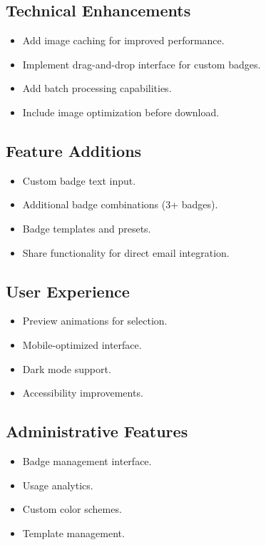 \documentclass[12pt]{article}
\begin{document}
\subsection{Technical Enhancements}
\begin{itemize}
    \item Add image caching for improved performance.
    \item Implement drag-and-drop interface for custom badges.
    \item Add batch processing capabilities.
    \item Include image optimization before download.
\end{itemize}

\subsection{Feature Additions}
\begin{itemize}
    \item Custom badge text input.
    \item Additional badge combinations (3+ badges).
    \item Badge templates and presets.
    \item Share functionality for direct email integration.
\end{itemize}

\subsection{User Experience}
\begin{itemize}
    \item Preview animations for selection.
    \item Mobile-optimized interface.
    \item Dark mode support.
    \item Accessibility improvements.
\end{itemize}

\subsection{Administrative Features}
\begin{itemize}
    \item Badge management interface.
    \item Usage analytics.
    \item Custom color schemes.
    \item Template management.
\end{itemize}
\end{document}
